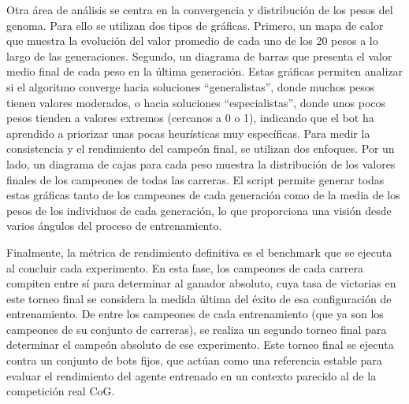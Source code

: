 Otra área de análisis se centra en la convergencia y distribución de los pesos del genoma. Para ello se utilizan dos tipos de gráficas. Primero, un mapa de calor que muestra la evolución del valor promedio de cada uno de los 20 pesos a lo largo de las generaciones. Segundo, un diagrama de barras que presenta el valor medio final de cada peso en la última generación. Estas gráficas permiten analizar si el algoritmo converge hacia soluciones ``generalistas'', donde muchos pesos tienen valores moderados, o hacia soluciones ``especialistas'', donde unos pocos pesos tienden a valores extremos (cercanos a 0 o 1), indicando que el bot ha aprendido a priorizar unas pocas heurísticas muy específicas. Para medir la consistencia y el rendimiento del campeón final, se utilizan dos enfoques. Por un lado, un diagrama de cajas para cada peso muestra la distribución de los valores finales de los campeones de todas las carreras. El script permite generar todas estas gráficas tanto de los campeones de cada generación como de la media de los pesos de los individuos de cada generación, lo que proporciona una visión desde varios ángulos del proceso de entrenamiento.

Finalmente, la métrica de rendimiento definitiva es el benchmark que se ejecuta al concluir cada experimento. En esta fase, los campeones de cada carrera compiten entre sí para determinar al ganador absoluto, cuya tasa de victorias en este torneo final se considera la medida última del éxito de esa configuración de entrenamiento. De entre los campeones de cada entrenamiento (que ya son los campeones de su conjunto de carreras), se realiza un segundo torneo final para determinar el campeón absoluto de ese experimento. Este torneo final se ejecuta contra un conjunto de bots fijos, que actúan como una referencia estable para evaluar el rendimiento del agente entrenado en un contexto parecido al de la competición real CoG.

